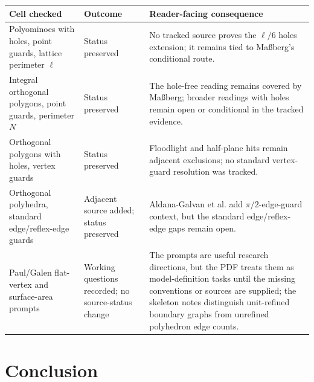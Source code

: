 \documentclass[11pt]{article}
\begin{document}
\begin{center}
\footnotesize
\renewcommand{\arraystretch}{1.08}
\begin{tabularx}{\textwidth}{
  >{\raggedright\arraybackslash}p{}
  >{\raggedright\arraybackslash}p{}
  Y}
\toprule
Cell checked & Outcome & Reader-facing consequence \\
\midrule
Polyominoes with holes, point guards, lattice perimeter $\ell$ &
Status preserved &
No tracked source proves the $\ell/6$ holes extension; it remains tied to
Ma{\ss}berg's conditional route. \\

Integral orthogonal polygons, point guards, perimeter $N$ &
Status preserved &
The hole-free reading remains covered by Ma{\ss}berg; broader readings with
holes remain open or conditional in the tracked evidence. \\

Orthogonal polygons with holes, vertex guards &
Status preserved &
Floodlight and half-plane hits remain adjacent exclusions; no standard
vertex-guard resolution was tracked. \\

Orthogonal polyhedra, standard edge/reflex-edge guards &
Adjacent source added; status preserved &
Aldana-Galvan et al. add $\pi/2$-edge-guard context, but the standard
edge/reflex-edge gaps remain open. \\

Paul/Galen flat-vertex and surface-area prompts &
Working questions recorded; no source-status change &
The prompts are useful research directions, but the PDF treats them as
model-definition tasks until the missing conventions or sources are supplied;
the skeleton notes distinguish unit-refined boundary graphs from unrefined
polyhedron edge counts.
\\
\bottomrule
\end{tabularx}
\end{center}

\section{Conclusion}
\end{document}
